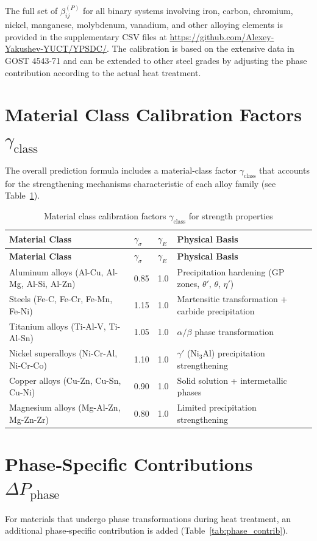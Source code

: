 \documentclass[12pt,a4paper]{article}
\begin{document}
	The full set of $\beta_{ij}^{(P)}$ for all binary systems involving iron, carbon, chromium, nickel, manganese, molybdenum, vanadium, and other alloying elements is provided in the supplementary CSV files at \url{https://github.com/Alexey-Yakushev-YUCT/YPSDC/}. The calibration is based on the extensive data in GOST 4543-71 and can be extended to other steel grades by adjusting the phase contribution according to the actual heat treatment.
	
	\section{Material Class Calibration Factors $\gamma_{\text{class}}$}
	The overall prediction formula includes a material‑class factor $\gamma_{\text{class}}$ that accounts for the strengthening mechanisms characteristic of each alloy family (see Table~\ref{tab:gamma_class}).
	
	\begin{longtable}{p{3.5cm} p{2.5cm} p{2.5cm} p{5cm}}
		\caption{Material class calibration factors $\gamma_{\text{class}}$ for strength properties}\label{tab:gamma_class}\\
		\toprule
		\textbf{Material Class} & $\gamma_{\sigma}$ & $\gamma_{E}$ & \textbf{Physical Basis} \\
		\midrule
		\endfirsthead
		\toprule
		\textbf{Material Class} & $\gamma_{\sigma}$ & $\gamma_{E}$ & \textbf{Physical Basis} \\
		\midrule
		\endhead
		Aluminum alloys (Al-Cu, Al-Mg, Al-Si, Al-Zn) & 0.85 & 1.0 & Precipitation hardening (GP zones, $\theta'$, $\theta$, $\eta'$) \\
		Steels (Fe-C, Fe-Cr, Fe-Mn, Fe-Ni) & 1.15 & 1.0 & Martensitic transformation + carbide precipitation \\
		Titanium alloys (Ti-Al-V, Ti-Al-Sn) & 1.05 & 1.0 & $\alpha/\beta$ phase transformation \\
		Nickel superalloys (Ni-Cr-Al, Ni-Cr-Co) & 1.10 & 1.0 & $\gamma'$ (Ni$_3$Al) precipitation strengthening \\
		Copper alloys (Cu-Zn, Cu-Sn, Cu-Ni) & 0.90 & 1.0 & Solid solution + intermetallic phases \\
		Magnesium alloys (Mg-Al-Zn, Mg-Zn-Zr) & 0.80 & 1.0 & Limited precipitation strengthening \\
		\bottomrule
	\end{longtable}
	
	\section{Phase‑Specific Contributions $\Delta P_{\text{phase}}$}
	For materials that undergo phase transformations during heat treatment, an additional phase‑specific contribution is added (Table~\ref{tab:phase_contrib}).
	
\end{document}
